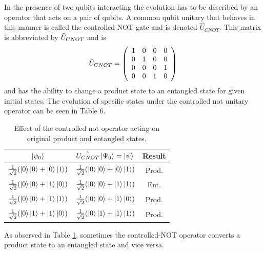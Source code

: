 \documentclass[twocolumn]{article}
\begin{document}
In the presence of two qubits interacting the evolution has to be described by an operator that acts on a pair of qubits. A common qubit unitary that behaves in this manner is called the controlled-NOT gate and is denoted $\hat{U}_{CNOT}$. This matrix is abbreviated by $\hat{U}_{\tiny{CNOT}}$ and is
\begin{equation} \label{Eq: UOCNOT}
\hat{U}_{\tiny{CNOT}}=
\left(\begin{array}{cccc}
1 & 0 & 0 & 0 \\
0 & 1 & 0 & 0 \\
0 & 0 & 0 & 1 \\
0 & 0 & 1 & 0 \\
\end{array}\right)
\end{equation}
and has the ability to change a product state to an entangled state for given initial states. The evolution of specific states under the controlled not unitary operator can be seen in Table 6.
\newpage
\begin{table}[ht]
    \centering
    \begin{tabular}{|c|c|c|}
        \hline $\ket{\psi_0}$ & $\hat{U_{CNOT}}\ket{\Psi_0}=\ket{\psi}$ & Result \\
        \hline $\frac{1}{\sqrt{2}}(\ket{0}\ket{0}+\ket{0}\ket{1})$ & $\frac{1}{\sqrt{2}}(\ket{0}\ket{0}+\ket{0}\ket{1})$ & Prod. \\
        \hline $\frac{1}{\sqrt{2}}(\ket{0}\ket{0}+\ket{1}\ket{0})$ & $\frac{1}{\sqrt{2}}(\ket{0}\ket{0}+\ket{1}\ket{1})$ & Ent. \\
        \hline $\frac{1}{\sqrt{2}}(\ket{0}\ket{0}+\ket{1}\ket{1})$ & $\frac{1}{\sqrt{2}}(\ket{0}\ket{0}+\ket{1}\ket{0})$ & Prod. \\
        \hline $\frac{1}{\sqrt{2}}(\ket{0}\ket{1}+\ket{1}\ket{0})$ & $\frac{1}{\sqrt{2}}(\ket{0}\ket{1}+\ket{1}\ket{1})$ & Prod. \\
        \hline
    \end{tabular}
    \caption{\footnotesize{Effect of the controlled not operator acting on original product and entangled states.}}
    \label{Tab: CNOTOEAPS}
\end{table}
\par \noindent
As observed in Table \ref{Tab: CNOTOEAPS}, sometimes the controlled-NOT operator converts a product state to an entangled state and vice versa.
\end{document}
